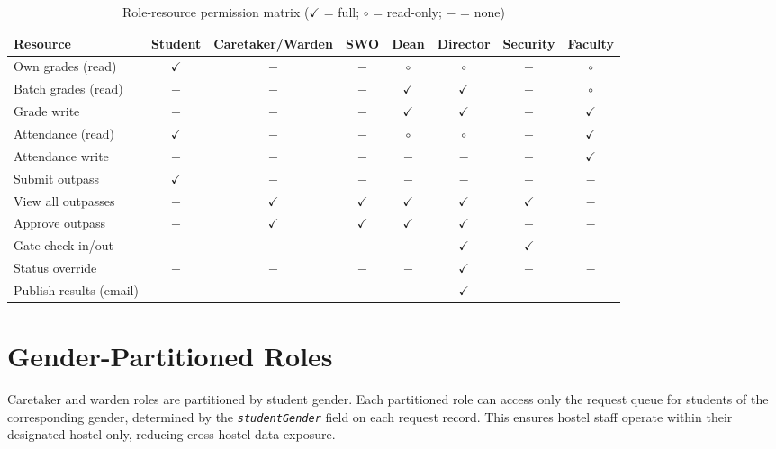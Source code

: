 \documentclass[12pt,a4paper]{report}
\newcommand{\field}[1]{\texttt{\textit{#1}}}
\begin{document}
\begin{table}[H]
\centering
\caption{Role-resource permission matrix ($\checkmark$ = full; $\circ$ = read-only; $-$ = none)}
\label{tab:perm}
\renewcommand{\arraystretch}{1.2}
\small
\begin{tabular}{lccccccc}
\toprule
\textbf{Resource} & \textbf{Student} & \textbf{Caretaker/Warden} & \textbf{SWO} & \textbf{Dean} & \textbf{Director} & \textbf{Security} & \textbf{Faculty} \\
\midrule
Own grades (read)       & $\checkmark$ & $-$ & $-$ & $\circ$ & $\circ$ & $-$ & $\circ$ \\
Batch grades (read)     & $-$ & $-$ & $-$ & $\checkmark$ & $\checkmark$ & $-$ & $\circ$ \\
Grade write             & $-$ & $-$ & $-$ & $\checkmark$ & $\checkmark$ & $-$ & $\checkmark$ \\
Attendance (read)       & $\checkmark$ & $-$ & $-$ & $\circ$ & $\circ$ & $-$ & $\checkmark$ \\
Attendance write        & $-$ & $-$ & $-$ & $-$ & $-$ & $-$ & $\checkmark$ \\
Submit outpass          & $\checkmark$ & $-$ & $-$ & $-$ & $-$ & $-$ & $-$ \\
View all outpasses      & $-$ & $\checkmark$ & $\checkmark$ & $\checkmark$ & $\checkmark$ & $\checkmark$ & $-$ \\
Approve outpass         & $-$ & $\checkmark$ & $\checkmark$ & $\checkmark$ & $\checkmark$ & $-$ & $-$ \\
Gate check-in/out       & $-$ & $-$ & $-$ & $-$ & $\checkmark$ & $\checkmark$ & $-$ \\
Status override         & $-$ & $-$ & $-$ & $-$ & $\checkmark$ & $-$ & $-$ \\
Publish results (email) & $-$ & $-$ & $-$ & $-$ & $\checkmark$ & $-$ & $-$ \\
\bottomrule
\end{tabular}
\end{table}

\section{Gender-Partitioned Roles}

Caretaker and warden roles are partitioned by student gender. Each partitioned role can access only the request queue for students of the corresponding gender, determined by the \field{studentGender} field on each request record. This ensures hostel staff operate within their designated hostel only, reducing cross-hostel data exposure.
\end{document}
